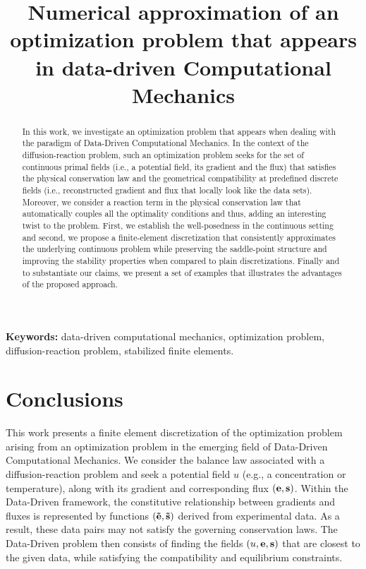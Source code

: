 \documentclass[12pt]{article}
\title{Numerical approximation of an optimization problem that appears in  data-driven Computational Mechanics}
\date{\the \year}
\begin{document}
\maketitle

\begin{abstract}
	In this work, we investigate an optimization problem that appears when dealing with the paradigm of Data-Driven Computational Mechanics. In the context of the diffusion-reaction problem, such an optimization problem seeks for the set of continuous primal fields (i.e., a potential field, its gradient and the flux) that satisfies the physical conservation law and the geometrical compatibility at predefined discrete fields (i.e., reconstructed gradient and flux that locally look like the data sets). Moreover, we consider a reaction term in the physical conservation law that automatically couples all the optimality conditions and thus, adding an interesting twist to the problem. First, we establish the well-posedness in the continuous setting and second, we propose a finite-element discretization that consistently approximates the underlying continuous problem while preserving the saddle-point structure and improving the stability properties when compared to plain discretizations. Finally and to substantiate our claims, we present a set of examples that illustrates the advantages of the proposed approach.
\end{abstract}

\textbf{Keywords:} data-driven computational mechanics, optimization problem, diffusion-reaction problem, stabilized finite elements. 








\section{Conclusions}

This work presents a finite element discretization of the optimization problem arising from an optimization problem in the emerging field of Data-Driven Computational Mechanics.
We consider the balance law associated with a diffusion-reaction problem and seek a potential field $u$ (e.g., a concentration or temperature), along with its gradient and corresponding flux $(\mathbf{e}, \mathbf{s})$.
Within the Data-Driven framework, the constitutive relationship between gradients and fluxes is represented by functions $(\mathbf{\tilde{e}}, \mathbf{\tilde{s}})$ derived from experimental data. As a result, these data pairs may not satisfy the governing conservation laws. The Data-Driven problem then consists of finding the fields $(u, \mathbf{e}, \mathbf{s})$ that are closest to the given data, while satisfying the compatibility and equilibrium constraints.
\end{document}
